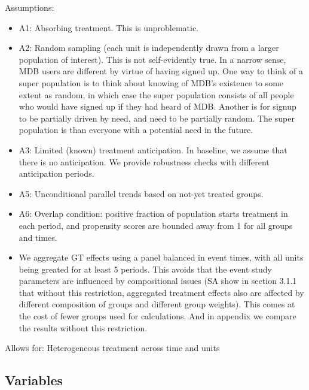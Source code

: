Assumptions:
\begin{itemize}
    \item A1: Absorbing treatment. This is unproblematic.

    \item A2: Random sampling (each unit is independently drawn from a larger
        population of interest). This is not self-evidently true. In a narrow
        sense, MDB users are different by virtue of having signed up. One way
        to think of a super population is to think about knowing of MDB's
        existence to some extent as random, in which case the super population
        consists of all people who would have signed up if they had heard of
        MDB. Another is for signup to be partially driven by need, and need to
        be partially random. The super population is than everyone with a
        potential need in the future.

    \item A3: Limited (known) treatment anticipation. In baseline, we assume
        that there is no anticipation. We provide robustness checks with
        different anticipation periods.

    \item A5: Unconditional parallel trends based on not-yet treated groups.

    \item A6: Overlap condition: positive fraction of population starts
        treatment in each period, and propensity scores are bounded away from 1
        for all groups and times.

    \item We aggregate GT effects using a panel balanced in event times, with
        all units being greated for at least 5 periods. This avoids that the
        event study parameters are influenced by compositional issues (SA show
        in section 3.1.1 that without this restriction, aggregated treatment
        effects also are affected by different composition of groups and
        different group weights). This comes at the cost of fewer groups used
        for calculations. And in appendix we compare the results without this
        restriction.
\end{itemize} 

Allows for: Heterogeneous treatment across time and units


\subsection{Variables}%
\label{sub:variables}



